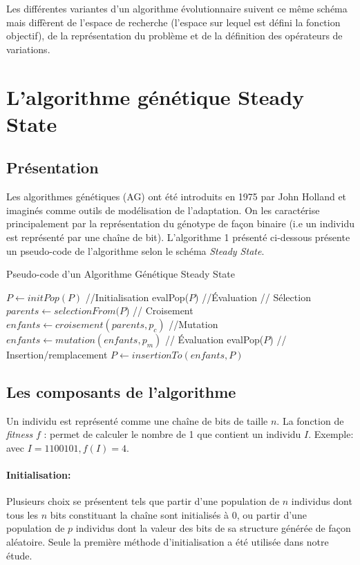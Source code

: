 \documentclass[twocolumn]{article}
\begin{document}
Les différentes variantes d'un algorithme évolutionnaire suivent ce même schéma mais diffèrent de l'espace de recherche (l'espace sur lequel est défini la fonction objectif), de la représentation du problème et de la définition des opérateurs de variations.

\section{L'algorithme génétique Steady State}
\subsection{ Présentation}
Les algorithmes génétiques (AG) ont été introduits en 1975 par John Holland et imaginés comme outils de modélisation de l'adaptation. On les caractérise principalement par la représentation du génotype de façon binaire (i.e un individu est représenté par une chaîne de bit).  L'algorithme 1 présenté ci-dessous  présente un  pseudo-code de l'algorithme selon le schéma \emph{Steady State}.

\begin{algorithm}
\caption{Pseudo-code d'un Algorithme Génétique Steady State}
\begin{algorithmic}[1]
\State $P\gets initPop(P)$ //Initialisation
\State evalPop($P$) //Évaluation 
    \State // Sélection
    \State $parents \gets selectionFrom(P$)
    \State // Croisement
    \State $enfants\gets croisement(parents, p_c)$ 
    \State //Mutation
    \State $enfants\gets mutation(enfants, p_m)$
    \State // Évaluation
    \State evalPop($P$)
    \State // Insertion/remplacement
    \State $P\gets insertionTo(enfants,P)$ 
\EndWhile
\end{algorithmic}
\end{algorithm}

\subsection{Les composants de l'algorithme}

Un individu est représenté comme une chaîne de bits de taille $n$.
La fonction de \emph{fitness} $f$ : permet de calculer le nombre de 1 que contient un individu $I$. Exemple: avec $I= 1100101, f(I) = 4.$
	
\paragraph{Initialisation:}
Plusieurs choix se présentent tels que partir d'une population de $n$ individus dont tous les $n$ bits constituant la chaîne sont initialisés à $0$, ou partir d'une population de $p$ individus dont la valeur des bits de sa structure générée de façon aléatoire. Seule la première méthode d'initialisation a été utilisée dans notre étude.
\end{document}
